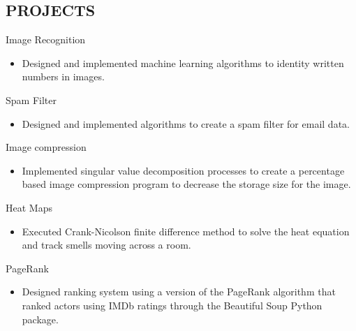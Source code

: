 \documentclass[margin]{res}
\begin{document}
\begin{resume}
\section{PROJECTS}Image Recognition
		\begin{itemize} \itemsep -2pt
		\item Designed and implemented machine learning algorithms to identity written numbers in images.
		\end{itemize}
		Spam Filter
		\begin{itemize} \itemsep -2pt
		\item Designed and implemented algorithms to create a spam filter for email data.
		\end{itemize}
		Image compression
		\begin{itemize} \itemsep -2pt
		\item Implemented singular value decomposition processes to create a percentage based image compression program to decrease the storage size for the image.
		\end{itemize}
		Heat Maps
		\begin{itemize} \itemsep -2pt
		\item Executed Crank-Nicolson finite difference method to solve the heat equation and track smells moving across a room.
		\end{itemize}
		PageRank
		\begin{itemize} \itemsep -2pt
		\item Designed ranking system using a version of the PageRank algorithm that ranked actors using IMDb ratings through the Beautiful Soup Python package.
		\end{itemize}
 
 

\end{resume}
\end{document}
